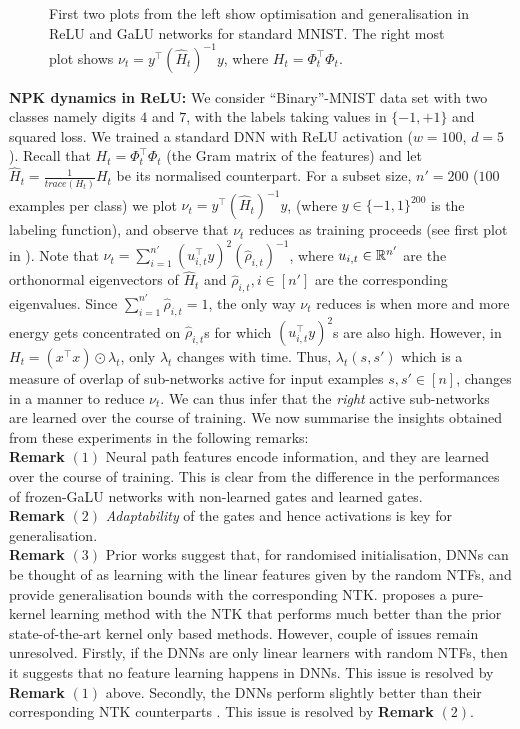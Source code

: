 \begin{figure}
{\begin{tabular}{ccc}
\end{tabular}
}
\caption{First two plots from the left show optimisation and generalisation in ReLU and GaLU networks for standard MNIST. The right most plot shows $\nu_t=y^\top (\widehat{H}_t)^{-1}y$, where $H_t=\Phi_t^\top \Phi_t$.}
\label{fig:gen}
\end{figure}
\textbf{NPK dynamics in ReLU:} We consider ``Binary''-MNIST data set with two classes namely digits $4$ and $7$, with the labels taking values in $\{-1,+1\}$ and squared loss. We trained a standard DNN with ReLU activation ($w=100$, $d=5$). Recall that $H_t=\Phi^\top_t\Phi_t$  (the Gram matrix of the features) and let $\widehat{H}_t=\frac{1}{trace(H_t)}H_t$ be its normalised counterpart. For a subset size, $n'=200$ ($100$ examples per class) we plot $\nu_t=y^\top (\widehat{H}_t)^{-1} y$, (where $y\in\{-1,1\}^{200}$ is the labeling function), and observe that $\nu_t$ reduces as training proceeds (see first plot in ). Note that $\nu_t=\sum_{i=1}^{n'}(u_{i,t}^\top y)^2 (\hat{\rho}_{i,t})^{-1}$, where $u_{i,t}\in \mathbb{R}^{n'}$ are the orthonormal eigenvectors of $\widehat{H}_t$ and $\hat{\rho}_{i,t},i\in[n']$ are the corresponding eigenvalues. Since $\sum_{i=1}^{n'}\hat{\rho}_{i,t}=1$, the only way $\nu_t$ reduces is when more and more energy gets concentrated on $\hat{\rho}_{i,t}$s for which $(u_{i,t}^\top y)^2$s are also high. However, in $H_t=(x^\top x)\odot \lambda_t$, only $\lambda_t$ changes with time. Thus, $\lambda_t(s,s')$ which is a measure of overlap of sub-networks active for input examples $s,s'\in[n]$, changes in a manner to reduce $\nu_t$. We can thus infer that the \emph{right} active sub-networks are learned over the course of training. We now summarise the insights obtained from these experiments in the following remarks:\hfill\\
\textbf{Remark} $(1)$ Neural path features encode information, and they are learned over the course of training. This is clear from the difference in the performances of frozen-GaLU networks with non-learned gates and learned gates.\hfill\\
\textbf{Remark} $(2)$ \emph{Adaptability} of the gates and hence activations is key for generalisation. \hfill \\
\textbf{Remark} $(3)$ Prior works \cite{arora,arora2019exact,cao2019generalization} suggest that, for randomised initialisation, DNNs can be thought of as learning with the linear features given by the random NTFs, and provide generalisation bounds with the corresponding NTK. \cite{arora2019exact} proposes a pure-kernel learning method with the NTK that  performs much better than the prior state-of-the-art kernel only based methods. However, couple of issues remain unresolved. Firstly, if the DNNs are only linear learners with random NTFs, then it suggests that no feature learning happens in DNNs. This issue is resolved by \textbf{Remark} $(1)$ above. Secondly, the DNNs perform slightly better than their corresponding NTK counterparts \cite{arora2019exact,lee2017deep}. This issue is resolved by \textbf{Remark} $(2)$.


